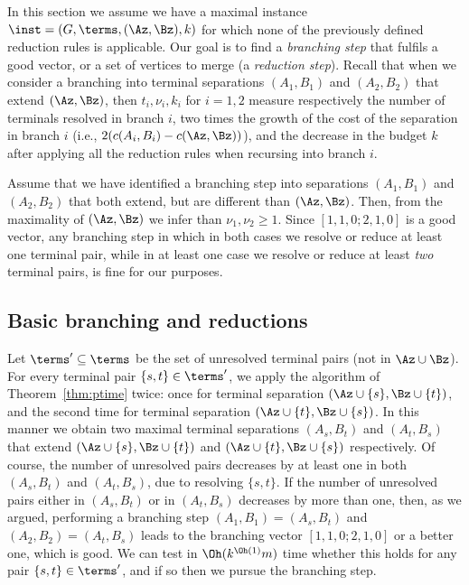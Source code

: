 In this section we assume we have a maximal instance $\inst = (G,\terms,(\Az,\Bz),k)$ for which none of the previously defined reduction rules is applicable.
Our goal is to find a {\em{branching step}} that fulfils a good vector,
or a set of vertices to merge (a {\em{reduction step}}). Recall that when we consider a branching into terminal separations $(A_1,B_1)$ and $(A_2,B_2)$ that extend $(\Az,\Bz)$, then $t_i,\nu_i,k_i$ for $i=1,2$ measure respectively the number of terminals resolved in branch $i$, two times the growth of the cost of the separation in branch $i$ (i.e., $2(c(A_i,B_i)-c(\Az,\Bz))$), and the decrease in the budget $k$ after applying all the reduction rules when recursing into branch $i$.

Assume that we have identified a branching step into separations
$(A_1,B_1)$ and $(A_2,B_2)$ that both extend, but are different than
$(\Az,\Bz)$. Then, from the maximality of $(\Az,\Bz)$ we infer than
$\nu_1,\nu_2 \geq 1$.
Since $[1,1,0;2,1,0]$ is a good vector, any branching step
in which in both cases we resolve or reduce at least one terminal pair,
while in at least one case we resolve or reduce at least \emph{two} terminal
pairs, is fine for our purposes. 

\subsection{Basic branching and reductions}

Let $\terms' \subseteq \terms$ be the set of unresolved terminal pairs (not in $\Az\cup \Bz$). For every terminal pair $\{s,t\}\in \terms'$, we apply the algorithm of Theorem~\ref{thm:ptime} twice: once for terminal separation $(\Az\cup \{s\},\Bz\cup \{t\})$, and the second time for terminal separation $(\Az\cup \{t\},\Bz\cup \{s\})$. In this manner we obtain two maximal terminal separations $(A_s,B_t)$ and $(A_t,B_s)$ that extend $(\Az\cup \{s\},\Bz\cup \{t\})$ and $(\Az\cup \{t\},\Bz\cup \{s\})$ respectively. Of course, the number of unresolved pairs decreases by at least one in both $(A_s,B_t)$ and $(A_t,B_s)$, due to resolving $\{s,t\}$. If the number of unresolved pairs either in $(A_s,B_t)$ or in $(A_t,B_s)$ decreases by more than one, then, as we argued, performing a branching step $(A_1,B_1)=(A_s,B_t)$ and $(A_2,B_2)=(A_t,B_s)$ leads to the branching vector $[1,1,0;2,1,0]$ or a better one, which is good. We can test in $\Oh(k^{\Oh(1)} m)$ time whether this holds for any pair $\{s,t\}\in \terms'$, and if so then we pursue the branching step. 

